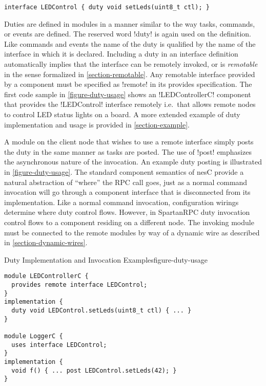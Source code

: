 \begin{lstlisting}
interface LEDControl { duty void setLeds(uint8_t ctl); }
\end{lstlisting}

Duties are defined in modules in a manner similar to the way tasks, commands, or events are
defined. The reserved word !duty! is again used on the definition. Like commands and events the
name of the duty is qualified by the name of the interface in which it is declared. Including a
duty in an interface definition automatically implies that the interface can be remotely
invoked, or is \emph{remotable} in the sense formalized in \autoref{section-remotable}. Any
remotable interface provided by a component must be specified as !remote! in its provides
specification. The first code sample in \autoref{figure-duty-usage} shows an !LEDControllerC!
component that provides the !LEDControl! interface remotely i.e.~that allows remote nodes to
control LED status lights on a board. A more extended example of duty implementation and usage
is provided in \autoref{section-example}.

A module on the client node that wishes to use a remote interface simply posts the duty in the
same manner as tasks are posted. The use of !post! emphasizes the asynchronous nature of the
invocation. An example duty posting is illustrated in \autoref{figure-duty-usage}. The standard
component semantics of nesC provide a natural abstraction of ``where'' the RPC call goes, just
as a normal command invocation will go through a component interface that is disconnected from
its implementation. Like a normal command invocation, configuration wirings determine where duty
control flows. However, in SpartanRPC duty invocation control flows to a component residing on a
different node. The invoking module must be connected to the remote modules by way of a dynamic
wire as described in \autoref{section-dynamic-wires}.

\begin{fpfig}[t]{Duty Implementation and Invocation Examples}{figure-duty-usage}
{
\singlespace
\begin{lstlisting}
module LEDControllerC {
  provides remote interface LEDControl;
}
implementation {
  duty void LEDControl.setLeds(uint8_t ctl) { ... }
} 
 
module LoggerC {
  uses interface LEDControl;
}
implementation {
  void f() { ... post LEDControl.setLeds(42); }
}
\end{lstlisting}
\primaryspacing
}
\end{fpfig}

